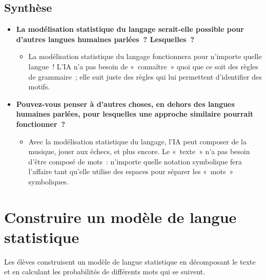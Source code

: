 \documentclass[12pt,a4paper]{article}
\begin{document}
\subsection{Synthèse}

\begin{thinkbox}
  \begin{itemize}
    \item \textbf{La modélisation statistique du langage serait-elle possible pour d'autres langues humaines parlées~? Lesquelles~?}
    \begin{itemize}
      \item La modélisation statistique du langage fonctionnera pour n'importe quelle langue~! L'IA n'a pas besoin de «~connaître~» quoi que ce soit des règles de grammaire~; elle suit juste des règles qui lui permettent d'identifier des motifs.
    \end{itemize}
    \item \textbf{Pouvez-vous penser à d'autres choses, en dehors des langues humaines parlées, pour lesquelles une approche similaire pourrait fonctionner~?}
    \begin{itemize}
      \item Avec la modélisation statistique du langage, l'IA peut composer de la musique, jouer aux échecs, et plus encore. Le «~texte~» n'a pas besoin d'être composé de mots~: n'importe quelle notation symbolique fera l'affaire tant qu'elle utilise des espaces pour séparer les «~mots~» symboliques.
    \end{itemize}
  \end{itemize}
\end{thinkbox}

\newpage

\section{Construire un modèle de langue statistique}

\begin{overviewbox}
  Les élèves construisent un modèle de langue statistique en décomposant le texte et en calculant les probabilités de différents mots qui se suivent.
\end{overviewbox}

\end{document}
